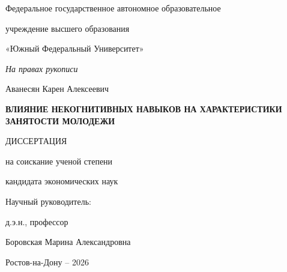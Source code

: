 
\begin{titlepage}
\thispagestyle{empty}
\begin{center}
{\fontsize{16pt}{18.4pt}\selectfont Федеральное государственное автономное образовательное\par}
{\fontsize{16pt}{18.4pt}\selectfont учреждение высшего образования\par}
{\fontsize{16pt}{18.4pt}\selectfont «Южный Федеральный Университет»\par}
\end{center}

\vspace{1.2cm}

\begin{flushright}
{\fontsize{14pt}{16.1pt}\selectfont\itshape На правах рукописи\par}
\end{flushright}

\vspace{2.0cm}

\begin{center}
{\fontsize{16pt}{18.4pt}\selectfont Аванесян Карен Алексеевич\par}

\vspace{1.1cm}

{\fontsize{16pt}{18.4pt}\selectfont\bfseries ВЛИЯНИЕ НЕКОГНИТИВНЫХ НАВЫКОВ НА ХАРАКТЕРИСТИКИ ЗАНЯТОСТИ МОЛОДЕЖИ\par}

\vspace{0.8cm}

{\fontsize{16pt}{18.4pt}\selectfont ДИССЕРТАЦИЯ\par}
{\fontsize{16pt}{18.4pt}\selectfont на соискание ученой степени\par}
{\fontsize{16pt}{18.4pt}\selectfont кандидата экономических наук\par}
\end{center}

\vspace{2.0cm}

\begin{flushright}
{\fontsize{16pt}{18.4pt}\selectfont Научный руководитель:\par}
{\fontsize{16pt}{18.4pt}\selectfont д.э.н., профессор\par}
{\fontsize{16pt}{18.4pt}\selectfont Боровская Марина Александровна\par}
\end{flushright}

\vfill

\begin{center}
{\fontsize{16pt}{18.4pt}\selectfont Ростов-на-Дону -- 2026\par}
\end{center}
\end{titlepage}

\clearpage
{}
\setcounter{page}{2}
\tableofcontents
\clearpage

